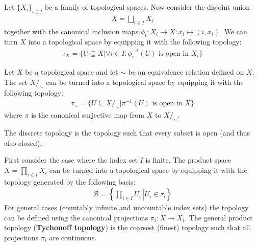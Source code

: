 	\begin{example}\label{topology:disjoint_union}
		Let $\{X_i\}_{i\in I}$ be a family of topological spaces. Now consider the disjoint union
		\begin{gather}
			X = \bigsqcup_{i\in I} X_i
		\end{gather}
		together with the canonical inclusion maps $\phi_i:X_i\rightarrow X:x_i\mapsto(i, x_i)$. We can turn $X$ into a topological space by equipping it with the following topology:
		\begin{gather}
			\tau_X = \{U\subseteq X| \forall i\in I:\phi_i^{-1}(U)\text{ is open in }X_i\}
		\end{gather}
	\end{example}

	\begin{example}
		Let $X$ be a topological space and let $\sim$ be an equivalence relation defined on $X$. The set $X/_\sim$ can be turned into a topological space by equipping it with the following topology:
		\begin{gather}
			\label{topology:quotient_space}
			\tau_\sim = \{U\subseteq X/_\sim|\pi^{-1}(U)\text{ is open in }X\}
		\end{gather}
		where $\pi$ is the canonical surjective map from $X$ to $X/_\sim$.
	\end{example}

	\begin{example}
		The discrete topology is the topology such that every subset is open (and thus also closed).
	\end{example}
	
	\begin{example}\label{topology:tychonoff_topology}
		First consider the case where the index set $I$ is finite. The product space $X = \prod_{i\in I}X_i$ can be turned into a topological space by equipping it with the topology generated by the following basis:
		\begin{gather}
			\mathcal{B} = \left\{\left.\prod_{i\in I}U_i\ \right|U_i\in\tau_i\right\}
		\end{gather}
		For general cases (countably infinite and uncountable index sets) the topology can be defined using the canonical projections $\pi_i:X\rightarrow X_i$. The general product topology (\textbf{Tychonoff topology}) is the coarsest (finest) topology such that all projections $\pi_i$ are continuous.
	\end{example}
	
